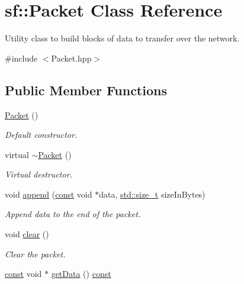 \hypertarget{classsf_1_1_packet}{\section{sf\-:\-:Packet Class Reference}
\label{classsf_1_1_packet}
}


Utility class to build blocks of data to transfer over the network.  




{\ttfamily \#include $<$Packet.\-hpp$>$}

\subsection*{Public Member Functions}
\begin{DoxyCompactItemize}
\item 
\hyperlink{classsf_1_1_packet_a786e5d4ced83992ceefa1799963ea858}{Packet} ()
\begin{DoxyCompactList}\small\item\em Default constructor. \end{DoxyCompactList}\item 
virtual \hyperlink{classsf_1_1_packet_adc0490ca3c7c3d1e321bd742e5213913}{$\sim$\-Packet} ()
\begin{DoxyCompactList}\small\item\em Virtual destructor. \end{DoxyCompactList}\item 
void \hyperlink{classsf_1_1_packet_a7dd6e429b87520008326c4d71f1cf011}{append} (\hyperlink{term__entry_8h_a57bd63ce7f9a353488880e3de6692d5a}{const} void $\ast$data, \hyperlink{nc__alloc_8h_a7b60c5629e55e8ec87a4547dd4abced4}{std\-::size\-\_\-t} size\-In\-Bytes)
\begin{DoxyCompactList}\small\item\em Append data to the end of the packet. \end{DoxyCompactList}\item 
void \hyperlink{classsf_1_1_packet_a133ea8b8fe6e93c230f0d79f19a3bf0d}{clear} ()
\begin{DoxyCompactList}\small\item\em Clear the packet. \end{DoxyCompactList}\item 
\hyperlink{term__entry_8h_a57bd63ce7f9a353488880e3de6692d5a}{const} void $\ast$ \hyperlink{classsf_1_1_packet_a304ba9ec94c992710f4dfff879c6340e}{get\-Data} () \hyperlink{term__entry_8h_a57bd63ce7f9a353488880e3de6692d5a}{const} 

\end{DoxyCompactItemize}
